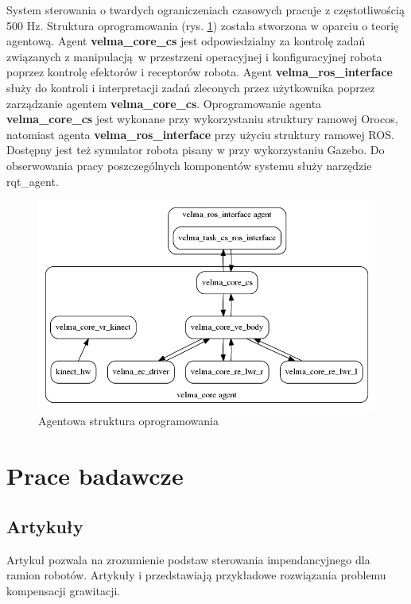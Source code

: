\documentclass[12pt,a4paper]{article}
\begin{document}
	System sterowania o twardych ograniczeniach czasowych pracuje z częstotliwością 500 Hz. Struktura oprogramowania (rys. \ref{fig:agenty}) została stworzona w oparciu o teorię agentową. Agent \textbf{velma\_core\_cs} jest odpowiedzialny za kontrolę zadań związanych z manipulacją w przestrzeni operacyjnej i konfiguracyjnej robota poprzez kontrolę efektorów i receptorów robota. Agent \textbf{velma\_ros\_interface} służy do kontroli i interpretacji zadań zleconych przez użytkownika poprzez zarządzanie agentem \textbf{velma\_core\_cs}. Oprogramowanie agenta \textbf{velma\_core\_cs} jest wykonane przy wykorzystaniu struktury ramowej Orocos, natomiast agenta \textbf{velma\_ros\_interface} przy użyciu struktury ramowej ROS. Dostępny jest też symulator robota pisany w przy wykorzystaniu Gazebo. Do obserwowania pracy poszczególnych komponentów systemu służy narzędzie rqt\_agent.
	
	\begin{figure}[H]
		\centering
		\includegraphics[width=0.8\linewidth]{agenty}
		\caption{Agentowa struktura oprogramowania \cite{velma}}
		\label{fig:agenty}
	\end{figure}
	
	\section{Prace badawcze}
	\subsection{Artykuły}
	Artykuł \cite{impedance} pozwala na zrozumienie podstaw sterowania impendancyjnego dla ramion robotów. Artykuły \cite{gravity1} i \cite{gravity2} przedstawiają przykładowe rozwiązania problemu kompensacji grawitacji.
	
\end{document}

